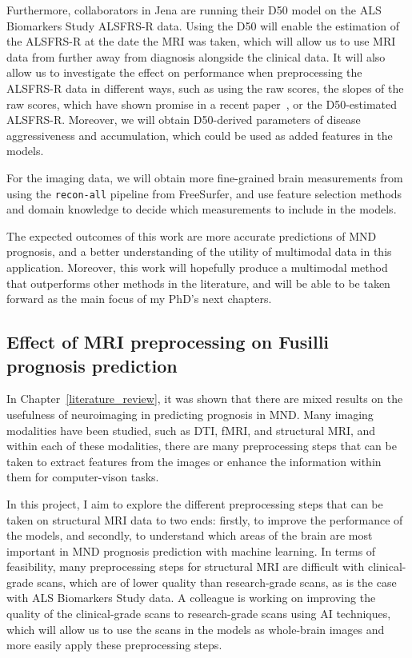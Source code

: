 Furthermore, collaborators in Jena are running their D50 model on the ALS Biomarkers Study ALSFRS-R data.
Using the D50 will enable the estimation of the ALSFRS-R at the date the MRI was taken, which will allow us to use MRI data from further away from diagnosis alongside the clinical data.
It will also allow us to investigate the effect on performance when preprocessing the ALSFRS-R data in different ways, such as using the raw scores, the slopes of the raw scores, which have shown promise in a recent paper~\cite{papaizEnsembleimbalancebasedClassificationAmyotrophic2024}, or the D50-estimated ALSFRS-R.
Moreover, we will obtain D50-derived parameters of disease aggressiveness and accumulation, which could be used as added features in the models.

For the imaging data, we will obtain more fine-grained brain measurements from using the \texttt{recon-all} pipeline from FreeSurfer, and use feature selection methods and domain knowledge to decide which measurements to include in the models.

The expected outcomes of this work are more accurate predictions of MND prognosis, and a better understanding of the utility of multimodal data in this application.
Moreover, this work will hopefully produce a multimodal method that outperforms other methods in the literature, and will be able to be taken forward as the main focus of my PhD's next chapters.

\subsection{Effect of MRI preprocessing on Fusilli prognosis prediction}

In Chapter~\ref{literature_review}, it was shown that there are mixed results on the usefulness of neuroimaging in predicting prognosis in MND.
Many imaging modalities have been studied, such as DTI, fMRI, and structural MRI, and within each of these modalities, there are many preprocessing steps that can be taken to extract features from the images or enhance the information within them for computer-vison tasks.

In this project, I aim to explore the different preprocessing steps that can be taken on structural MRI data to two ends: firstly, to improve the performance of the models, and secondly, to understand which areas of the brain are most important in MND prognosis prediction with machine learning.
In terms of feasibility, many preprocessing steps for structural MRI are difficult with clinical-grade scans, which are of lower quality than research-grade scans, as is the case with ALS Biomarkers Study data.
A colleague is working on improving the quality of the clinical-grade scans to research-grade scans using AI techniques, which will allow us to use the scans in the models as whole-brain images and more easily apply these preprocessing steps.

